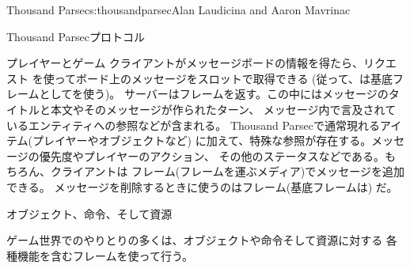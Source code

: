 \begin{aosachapter}{Thousand Parsec}{s:thousandparsec}{Alan Laudicina and Aaron Mavrinac}
\begin{aosasect1}{Thousand Parsecプロトコル}
\begin{aosasect2}{プレイヤーとゲーム}
クライアントがメッセージボードの情報を得たら、リクエスト
を使ってボード上のメッセージをスロットで取得できる
(従って、は基底フレームとしてを使う)。
サーバーはフレームを返す。この中にはメッセージのタイトルと本文やそのメッセージが作られたターン、
メッセージ内で言及されているエンティティへの参照などが含まれる。
Thousand Parsecで通常現れるアイテム(プレイヤーやオブジェクトなど)
に加えて、特殊な参照が存在する。メッセージの優先度やプレイヤーのアクション、
その他のステータスなどである。もちろん、クライアントは
フレーム(フレームを運ぶメディア)でメッセージを追加できる。
メッセージを削除するときに使うのはフレーム(基底フレームは)
だ。

\end{aosasect2}

\begin{aosasect2}{オブジェクト、命令、そして資源}

ゲーム世界でのやりとりの多くは、オブジェクトや命令そして資源に対する
各種機能を含むフレームを使って行う。


\end{aosasect2}
\end{aosasect1}
\end{aosachapter}
